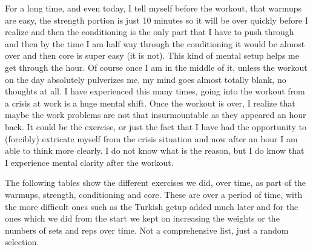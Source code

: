 \documentclass[
  oneside]{book}
\begin{document}
For a long time, and even today, I tell myself before the workout, that warmups are easy, the strength portion is just 10 minutes so it will be over quickly before I realize and then the conditioning is the only part that I have to push through and then by the time I am half way through the conditioning it would be almost over and then core is super easy (it is not). This kind of mental setup helps me get through the hour. Of course once I am in the middle of it, unless the workout on the day absolutely pulverizes me, my mind goes almost totally blank, no thoughts at all. I have experienced this many times, going into the workout from a crisis at work is a huge mental shift. Once the workout is over, I realize that maybe the work problems are not that insurmountable as they appeared an hour back. It could be the exercise, or just the fact that I have had the opportunity to (forcibly) extricate myself from the crisis situation and now after an hour I am able to think more clearly. I do not know what is the reason, but I do know that I experience mental clarity after the workout.

The following tables show the different exercises we did, over time, as part of the warmups, strength, conditioning and core. These are over a period of time, with the more difficult ones such as the Turkish getup added much later and for the ones which we did from the start we kept on increasing the weights or the numbers of sets and reps over time. Not a comprehensive list, just a random selection.

\begin{table}[H]
\centering
{}
\end{table}
\end{document}
